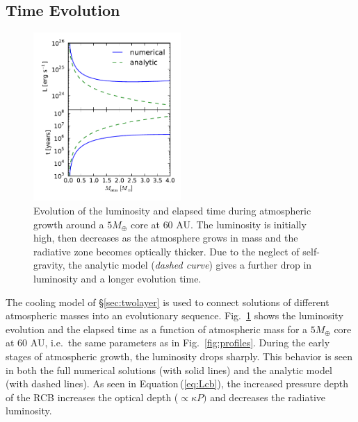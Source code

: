 \documentclass[apj, numberedappendix]{emulateapj}
\newcommand{\Eq}[1]{Equation\,(\ref{#1})}
\newcommand{\Fig}[1]{Fig.~\ref{#1}}
\begin{document}
\subsection{Time Evolution}\label{sec:timeev}

\begin{figure}[tb]
\centering
\includegraphics[width=0.5\textwidth]{../../figs/ModelAtmospheres/RadSelfGravPoly/PaperFigs/Lt_profiles_v2.pdf}
\caption{Evolution of the luminosity and elapsed time during atmospheric growth around a $5 M_{\oplus}$ core at $60$ AU.  The luminosity is initially high, then decreases as the atmosphere grows in mass and the radiative zone becomes optically thicker.  Due to the neglect of self-gravity, the analytic model (\emph{dashed curve}) gives a further drop in luminosity and a longer evolution time.}
\label{fig:Ltplot}
\end{figure}

The cooling model of \S\ref{sec:twolayer} is used to connect solutions of different atmospheric masses into an evolutionary sequence.  \Fig{fig:Ltplot} shows the luminosity evolution and the elapsed time as a function of atmospheric mass for a $5 M_{\oplus}$ core at $60$ AU, i.e.\ the same parameters as in \Fig{fig:profiles}.  During the early stages of atmospheric growth, the luminosity drops sharply.  This behavior is seen in both the full numerical solutions (with solid lines) and the analytic model (with dashed lines).  As seen in \Eq{eq:Lcb}, the increased pressure depth of the RCB increases the optical depth ($\propto \kappa P)$ and decreases the radiative luminosity.

\end{document}
